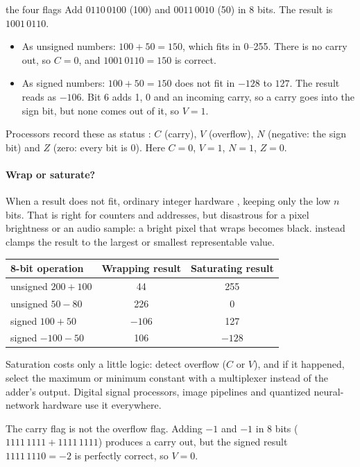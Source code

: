 \begin{worked}{the four flags}
Add $0110\,0100$ (100) and $0011\,0010$ (50) in 8 bits. The result is $1001\,0110$.
\begin{itemize}
  \item As unsigned numbers: $100 + 50 = 150$, which fits in 0--255. There is no carry out, so $C = 0$, and $1001\,0110 = 150$ is correct.
  \item As signed numbers: $100 + 50 = 150$ does not fit in $-128$ to $127$. The result reads as $-106$. Bit 6 adds 1, 0 and an incoming carry, so a carry goes into the sign bit, but none comes out of it, so $V = 1$.
\end{itemize}
Processors record these as status : $C$ (carry), $V$ (overflow), $N$ (negative: the sign bit) and $Z$ (zero: every bit is 0). Here $C = 0$, $V = 1$, $N = 1$, $Z = 0$.
\end{worked}

\paragraph{Wrap or saturate?} When a result does not fit, ordinary integer hardware , keeping only the low $n$ bits. That is right for counters and addresses, but disastrous for a pixel brightness or an audio sample: a bright pixel that wraps becomes black.  instead clamps the result to the largest or smallest representable value.

\begin{center}
\begin{tabular}{lcc}
\toprule
8-bit operation & Wrapping result & Saturating result \\
\midrule
unsigned $200 + 100$ & 44 & 255 \\
unsigned $50 - 80$ & 226 & 0 \\
signed $100 + 50$ & $-106$ & 127 \\
signed $-100 - 50$ & 106 & $-128$ \\
\bottomrule
\end{tabular}
\end{center}

Saturation costs only a little logic: detect overflow ($C$ or $V$), and if it happened, select the maximum or minimum constant with a multiplexer instead of the adder's output. Digital signal processors, image pipelines and quantized neural-network hardware use it everywhere.

\begin{trap}
The carry flag is not the overflow flag. Adding $-1$ and $-1$ in 8 bits ($1111\,1111 + 1111\,1111$) produces a carry out, but the signed result $1111\,1110 = -2$ is perfectly correct, so $V = 0$.
\end{trap}

